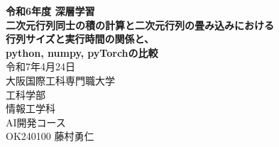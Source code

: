 \begin{titlepage}
    \centering
    \textbf{\LARGE 令和6年度 深層学習}
     \\
    \textbf{\LARGE
        二次元行列同士の積の計算と二次元行列の畳み込みにおける\\
        行列サイズと実行時間の関係と、\\
        python, numpy, pyTorchの比較
    }
     \\
    \large 令和7年4月24日
    \vspace{10pt} \\
    \large 大阪国際工科専門職大学 \\
    \large 工科学部 \\
    \large 情報工学科 \\
    \large AI開発コース
    \vspace{10pt} \\
    \large OK240100 藤村勇仁
\end{titlepage}
